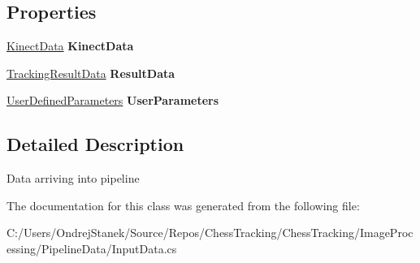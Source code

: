 \subsection*{Properties}
\begin{DoxyCompactItemize}
\item 
\mbox{\label{class_chess_tracking_1_1_image_processing_1_1_pipeline_data_1_1_input_data_aba8a1e51d17b06d7524d48f6503c5337}} 
\mbox{\hyperlink{class_chess_tracking_1_1_image_processing_1_1_pipeline_data_1_1_kinect_data}{Kinect\+Data}} {\bfseries Kinect\+Data}
\item 
\mbox{\label{class_chess_tracking_1_1_image_processing_1_1_pipeline_data_1_1_input_data_ab1d3583b33972432594325418563197f}} 
\mbox{\hyperlink{class_chess_tracking_1_1_image_processing_1_1_pipeline_data_1_1_tracking_result_data}{Tracking\+Result\+Data}} {\bfseries Result\+Data}
\item 
\mbox{\label{class_chess_tracking_1_1_image_processing_1_1_pipeline_data_1_1_input_data_a6f701fb4e6eeaa4a07ef0d8057f5532d}} 
\mbox{\hyperlink{class_chess_tracking_1_1_image_processing_1_1_pipeline_data_1_1_user_defined_parameters}{User\+Defined\+Parameters}} {\bfseries User\+Parameters}
\end{DoxyCompactItemize}


\subsection{Detailed Description}
Data arriving into pipeline 



The documentation for this class was generated from the following file\+:\begin{DoxyCompactItemize}
\item 
C\+:/\+Users/\+Ondrej\+Stanek/\+Source/\+Repos/\+Chess\+Tracking/\+Chess\+Tracking/\+Image\+Processing/\+Pipeline\+Data/Input\+Data.\+cs\end{DoxyCompactItemize}
